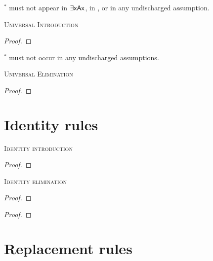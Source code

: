$^\ast$  must not appear in $\exists\mathsf{x}\mathsf{A}\mathsf{x}$, in , or in any undischarged assumption.
\bigskip

\noindent\textsc{Universal Introduction}

\begin{proof}
	 
\end{proof}

$^\ast$  must not occur in any undischarged assumptions.
\bigskip

\noindent\textsc{Universal Elimination}

\begin{proof}
	 
\end{proof}

\newpage

\section{Identity rules}

\noindent\textsc{Identity introduction}

\begin{proof}
	 
\end{proof}


\noindent\textsc{Identity elimination}

\begin{multicols}{2}
\begin{proof}
	 
\end{proof}
\begin{proof}
	 
\end{proof}
\end{multicols}



\section{Replacement rules}


